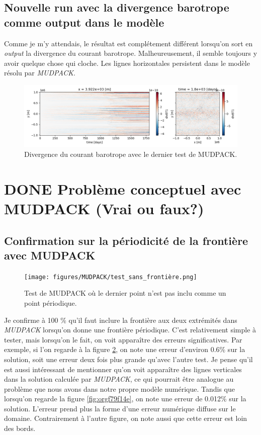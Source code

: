 \documentclass[10pt]{article}
\numberwithin{equation}{section}
\begin{document}
\subsection{Nouvelle run avec la divergence barotrope comme output dans le modèle}
\label{sec:orga79331f}

Comme je m'y attendais, le résultat est complétement différent lorsqu'on sort en \emph{output} la divergence du courant barotrope.
Malheureusement, il semble toujours y avoir quelque chose qui cloche.
Les lignes horizontales persistent dans le modèle résolu par \emph{MUDPACK}.

\begin{figure}[!htpb]
\centering
\includegraphics[width=.9\linewidth]{figures/debuggage/2023_07_03_comp_divBT.png}
\caption{\label{fig:orgfc78313}Divergence du courant barotrope avec le dernier test de MUDPACK.}
\end{figure}





\section{{\bfseries\sffamily DONE} Problème conceptuel avec MUDPACK (Vrai ou faux?)}
\label{sec:org5e345cf}

\subsection{Confirmation sur la périodicité de la frontière avec MUDPACK}
\label{sec:orge08cf52}

\begin{figure}[!htpb]
\centering
\texttt{[image: figures/MUDPACK/test\_sans\_frontière.png]}
\caption{\label{fig:orge774e60}Test de MUDPACK où le dernier point n'est pas inclu comme un point périodique.}
\end{figure}

Je confirme à 100 \% qu'il faut inclure la frontière aux deux extrémités dans \emph{MUDPACK} lorsqu'on donne une frontière périodique.
C'est relativement simple à tester, mais lorsqu'on le fait, on voit apparaître des erreurs significatives.
Par exemple, si l'on regarde à la figure \ref{fig:orge774e60}, on note une erreur d'environ 0.6\% sur la solution, soit une erreur deux fois plus grande qu'avec l'autre test.
Je pense qu'il est aussi intéressant de mentionner qu'on voit apparaître des lignes verticales dans la solution calculée par \emph{MUDPACK}, ce qui pourrait être analogue au problème que nous avons dans notre propre modèle numérique. 
Tandis que lorsqu'on regarde la figure \ref{fig:orgf79f14e}, on note une erreur de 0.012\% sur la solution.
L'erreur prend plus la forme d'une erreur numérique diffuse sur le domaine.
Contrairement à l'autre figure, on note aussi que cette erreur est loin des bords. \bigskip
\end{document}
